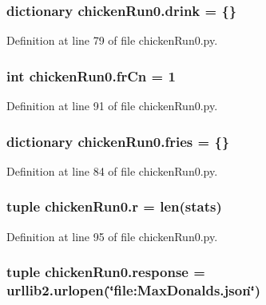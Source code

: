 \hypertarget{namespacechickenRun0_a475ad43e9de896f9a0782e9aa5504f8c}{
\subsubsection[{drink}]{\setlength{\rightskip}{0pt plus 5cm}dictionary chicken\-Run0.\-drink = \{\}}}\label{namespacechickenRun0_a475ad43e9de896f9a0782e9aa5504f8c}


Definition at line 79 of file chicken\-Run0.\-py.

\hypertarget{namespacechickenRun0_a2983b8cf5a7f8aab95e80e4969533060}{
\subsubsection[{fr\-Cn}]{\setlength{\rightskip}{0pt plus 5cm}int chicken\-Run0.\-fr\-Cn = 1}}\label{namespacechickenRun0_a2983b8cf5a7f8aab95e80e4969533060}


Definition at line 91 of file chicken\-Run0.\-py.

\hypertarget{namespacechickenRun0_ac24c3a3f366da81659235647930187b8}{
\subsubsection[{fries}]{\setlength{\rightskip}{0pt plus 5cm}dictionary chicken\-Run0.\-fries = \{\}}}\label{namespacechickenRun0_ac24c3a3f366da81659235647930187b8}


Definition at line 84 of file chicken\-Run0.\-py.

\hypertarget{namespacechickenRun0_a9bb73b5b5e7c3efe92b9dca9972096b3}{
\subsubsection[{r}]{\setlength{\rightskip}{0pt plus 5cm}tuple chicken\-Run0.\-r = len({\bf stats})}}\label{namespacechickenRun0_a9bb73b5b5e7c3efe92b9dca9972096b3}


Definition at line 95 of file chicken\-Run0.\-py.

\hypertarget{namespacechickenRun0_a14223aed36f27a22742b06f9698c06a4}{
\subsubsection[{response}]{\setlength{\rightskip}{0pt plus 5cm}tuple chicken\-Run0.\-response = urllib2.\-urlopen(\char`\"{}file\-:\-Max\-Donalds.\-json\char`\"{})}}\label{namespacechickenRun0_a14223aed36f27a22742b06f9698c06a4}


